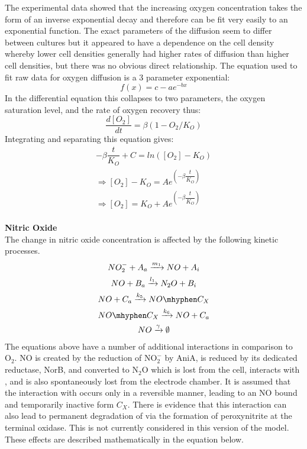The experimental data showed that the increasing oxygen concentration takes the form of an inverse exponential decay and therefore can be fit very easily to an exponential function. The exact parameters of the diffusion seem to differ between cultures but it appeared to have a dependence on the cell density whereby lower cell densities generally had higher rates of diffusion than higher cell densities, but there was no obvious direct relationship.
The equation used to fit raw data for oxygen diffusion is a 3 parameter exponential:
\begin{equation*}
f(x) = c - ae^{-bx}
\end{equation*}
In the differential equation this collapses to two parameters, the oxygen saturation level, and the rate of oxygen recovery thus:
\begin{equation*}
\dfrac{d[O_2]}{dt} = \beta(1-O_2/K_O)
\end{equation*}
Integrating and separating this equation gives:
\begin{equation*}
\begin{gathered}
-\beta\dfrac{t}{K_O} + C = ln([O_2]-K_O)\\
\Rightarrow [O_2]-K_O = Ae^{\left(-\beta\dfrac{t}{K_O}\right)}\\
\Rightarrow [O_2] = K_O + Ae^{\left(-\beta\dfrac{t}{K_O}\right)}
\end{gathered}
\end{equation*}
\\
{\bf Nitric Oxide}\\
The change in nitric oxide concentration is affected by the following kinetic processes.
\begin{equation*}
\begin{gathered}
NO_2^- + A_a \xrightarrow{m_1} NO + A_i\\
NO + B_a \xrightarrow{l_1} N_2O + B_i\\
NO + C_a \xrightarrow{k_5} NO\mhyphen C_X\\
NO\mhyphen C_X \xrightarrow{k_6} NO + C_a\\
NO \xrightarrow{\gamma} \emptyset
\end{gathered}
\end{equation*}
The equations above have a number of additional interactions in comparison to $\mathrm{O}_2$. NO is created by the reduction of $\mathrm{NO}_\mathrm{2}^\mathrm{-}$ by AniA, is reduced by its dedicated reductase, NorB, and converted to $\mathrm{N}_2\mathrm{O}$ which is lost from the cell, interacts with \cbbthree{}, and is also spontaneously lost from the electrode chamber. It is assumed that the interaction with \cbbthree{} occurs only in a reversible manner, leading to an NO bound and temporarily inactive form $C_X$. There is evidence that this interaction can also lead to permanent degradation of \cbbthree{} via the formation of peroxynitrite at the terminal oxidase. This is not currently considered in this version of the model. These effects are described mathematically in the equation below.
